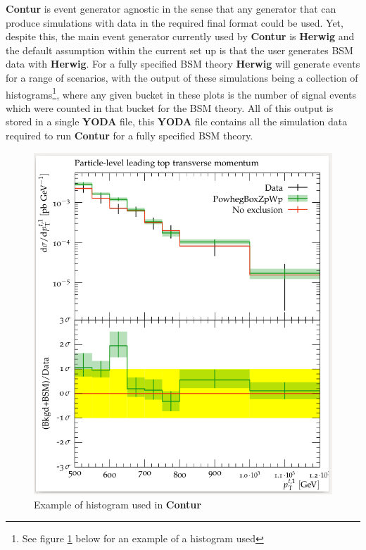 \textbf{Contur} is event generator agnostic in the sense that any generator that can produce simulations with data in the required final format could be used. Yet, despite this, the main event generator currently used by \textbf{Contur} is \textbf{Herwig}\cite{herwig} and the default assumption within the current set up is that the user generates BSM data with \textbf{Herwig}. For a fully specified BSM theory \textbf{Herwig} will generate events for a range of scenarios, with the output of these simulations being a collection of histograms\footnote{See figure \ref{fig:example_histogram} below for an example of a histogram used}, where any given bucket in these plots is the number of signal events which were counted in that bucket for the BSM theory. All of this output is stored in a single \textbf{YODA} file\cite{yoda}, this \textbf{YODA} file contains all the simulation data required to run \textbf{Contur} for a fully specified BSM theory.

\begin{figure}[H]
\centering
\includegraphics[scale=0.3]{plots/example_histogram.png}
\caption{Example of histogram used in \textbf{Contur}}
\label{fig:example_histogram}
\end{figure}

